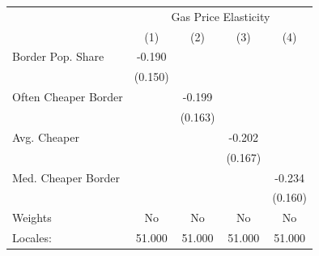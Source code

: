 {
\def\sym#1{\ifmmode^{#1}\else\(^{#1}\)\fi}
\begin{tabular}{l*{4}{c}}
\hline\hline
            &\multicolumn{4}{c}{Gas Price Elasticity}                                               \\
            &\multicolumn{1}{c}{(1)}         &\multicolumn{1}{c}{(2)}         &\multicolumn{1}{c}{(3)}         &\multicolumn{1}{c}{(4)}         \\
\hline
Border Pop. Share&      -0.190         &                     &                     &                     \\
            &     (0.150)         &                     &                     &                     \\
[1em]
Often Cheaper Border&                     &      -0.199         &                     &                     \\
            &                     &     (0.163)         &                     &                     \\
[1em]
Avg. Cheaper&                     &                     &      -0.202         &                     \\
            &                     &                     &     (0.167)         &                     \\
[1em]
Med. Cheaper Border&                     &                     &                     &      -0.234         \\
            &                     &                     &                     &     (0.160)         \\
\hline
Weights     &          No         &          No         &          No         &          No         \\
Locales:    &      51.000         &      51.000         &      51.000         &      51.000         \\
\hline\hline
\end{tabular}
}
